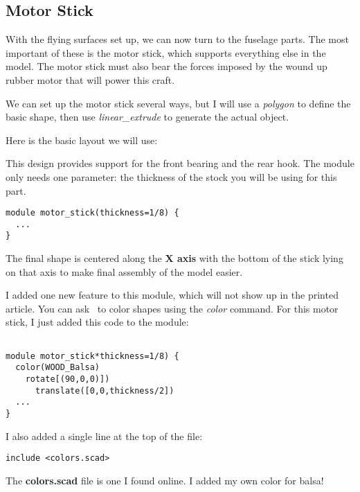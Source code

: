 \subsection{Motor Stick}

With the flying surfaces set up, we can now turn to the fuselage parts. The
most important of these is the motor stick, which supports everything else in
the model. The motor stick must also bear the forces imposed by the wound up
rubber motor that will power this craft.

We can set up the motor stick several ways, but I will use a {\it polygon} to
define the basic shape, then use {\it linear\_extrude} to generate the actual
object.

Here is the basic layout we will use:


This design provides support for the front bearing and the rear hook. The
module only needs one parameter: the thickness of the stock you will be using
for this part.

\begin{lstlisting}
module motor_stick(thickness=1/8) {
  ...
}
\end{lstlisting}

The final shape is centered along the {\bf X axis} with the bottom of the stick
lying on that axis to make final assembly of the model easier.


I added one new feature to this module, which will not show up in the printed
article. You can ask \osc\ to color shapes using the {\it color} command. For
this motor stick, I just added this code to the module:

\begin{lstlisting}

module motor_stick*thickness=1/8) {
  color(WOOD_Balsa)
    rotate[(90,0,0)])
      translate([0,0,thickness/2])
  ...
}
\end{lstlisting}

I also added a single line at the top of the file:

\begin{lstlisting}
include <colors.scad>
\end{lstlisting}

The {\bf colors.scad} file is one I found online. I added my own color for balsa!

